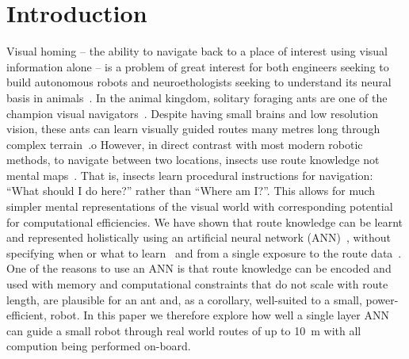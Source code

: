 \documentclass[letterpaper]{article}
\begin{document}
\section{Introduction}
Visual homing -- the ability to navigate back to a place of interest using visual information alone -- is a problem of great interest for both engineers seeking to build autonomous robots and neuroethologists seeking to understand its neural basis in animals~\citep{Graham2014}.
In the animal kingdom, solitary foraging ants are one of the champion visual navigators~\citep{Wehner2009}.
Despite having small brains and low resolution vision, these ants can learn visually guided routes many metres long through complex terrain~\citep{Knaden2016}.o
However, in direct contrast with most modern robotic methods, to navigate between two locations, insects use route knowledge not mental maps~\citep{Wehner2006}. 
That is, insects learn procedural instructions for navigation: ``What should I do here?'' rather than ``Where am I?''. 
This allows for much simpler mental representations of the visual world with corresponding potential for computational efficiencies.
We have shown that route knowledge can be learnt and represented holistically using an artificial neural network (ANN)~\citep{Philippides2015}, without specifying when or what to learn~\citep{Baddeley2011} and from a single exposure to the route data~\citep{Baddeley2012}. 
One of the reasons to use an ANN is that route knowledge can be encoded and used with memory and computational constraints that do not scale with route length, are plausible for an ant and, as a corollary, well-suited to a small, power-efficient, robot. 
In this paper we therefore explore how well a single layer ANN can guide a small robot through real world routes of up to \SI{10}{\metre} with all compution being performed on-board.
\end{document}

